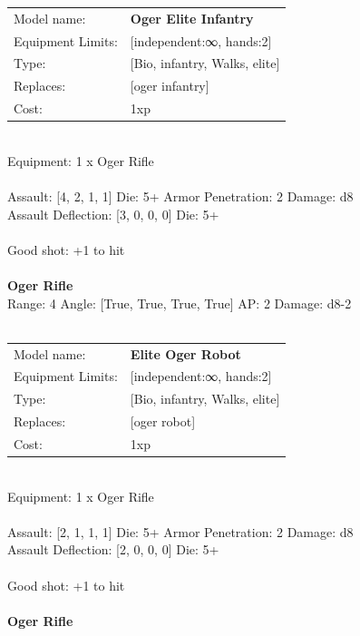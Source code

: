 \noindent
\begin{tabular}{ll}
Model name: &{\bf Oger Elite Infantry } \\
Equipment Limits: &[independent:∞, hands:2] \\
Type: &[Bio, infantry, Walks, elite] \\
Replaces: &[oger infantry] \\
Cost: & 1xp\\
\end{tabular}
\ \\
Equipment: 1 x Oger Rifle \\
\ \\
Assault: [4, 2, 1, 1] Die: 5+ Armor Penetration: 2 Damage: d8 \\
Assault Deflection: [3, 0, 0, 0] Die: 5+\\
\indent  
\ \\
Good shot: +1 to hit\\ 

\ \\
{\bf Oger Rifle } \\



Range: 4  Angle: [True, True, True, True] AP: 2 Damage: d8-2 \\




 
\ \\

\noindent
\begin{tabular}{ll}
Model name: &{\bf Elite Oger Robot } \\
Equipment Limits: &[independent:∞, hands:2] \\
Type: &[Bio, infantry, Walks, elite] \\
Replaces: &[oger robot] \\
Cost: & 1xp\\
\end{tabular}
\ \\
Equipment: 1 x Oger Rifle \\
\ \\
Assault: [2, 1, 1, 1] Die: 5+ Armor Penetration: 2 Damage: d8 \\
Assault Deflection: [2, 0, 0, 0] Die: 5+\\
\indent  
\ \\
Good shot: +1 to hit\\ 

\ \\
{\bf Oger Rifle } \\



